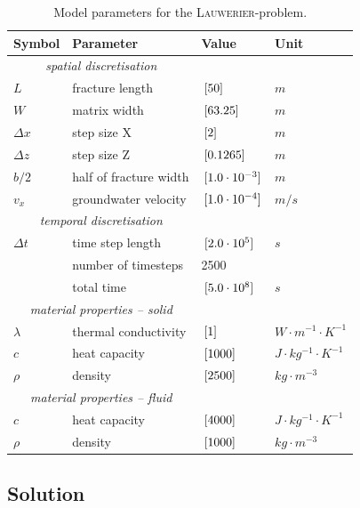 \begin{table}[!htbp]
\caption{\label{tab-lauwerier-parameters}Model parameters for the \textsc{Lauwerier}-problem.}
\begin{center}
\begin{tabular}{llll}
\toprule
Symbol & Parameter & Value & Unit \\
\midrule
\multicolumn{2}{c}{\textit{spatial discretisation}} \\
$L$ & fracture length	& $\, \mathrm{[}50]{}$ & ${m}$  \\
$W$ & matrix width & $\, \mathrm{[}63.25]{}$ & ${m}$  \\
$\Delta x$ & step size X 			& $\, \mathrm{[}2]{}$ & ${m}$  \\
$\Delta z$ & step size Z			& $\, \mathrm{[}0.1265]{}$ & ${m}$  \\
$b/2$ & half of fracture width 	& $\, \mathrm{[}1.0 \cdot 10^{-3}]{}$ & ${m}$  \\
$v_x$ & groundwater velocity 		& $\, \mathrm{[}1.0 \cdot 10^{-4}]{}$ & ${m/s}$ \\
\cmidrule{1-4}
\multicolumn{2}{c}{\textit{temporal discretisation}}\\
$\Delta t$ & time step length 			& $\, \mathrm{[}2.0 \cdot 10^{5}]{}$ & ${s}$  \\ 
& number of timesteps 				& 2500 \\
& total time 						& $\, \mathrm{[}5.0 \cdot 10^{8}]{}$ & ${s}$  \\
\cmidrule{1-4}
\multicolumn{2}{c}{\textit{material properties -- solid}}\\
$\lambda$ & thermal conductivity 	& $\, \mathrm{[}1]{}$ & ${W \cdot m^{-1} \cdot K^{-1}}$  \\
$c$ & heat capacity 				& $\, \mathrm{[}1000]{}$ & ${J \cdot kg^{-1} \cdot K^{-1}}$  \\
$\rho$ & density 					& $\, \mathrm{[}2500]{}$ & ${kg \cdot m^{-3}}$  \\
\cmidrule{1-4}
\multicolumn{2}{c}{\textit{material properties -- fluid}}\\
$c$ & heat capacity 				& $\, \mathrm{[}4000]{}$ & ${J \cdot kg^{-1} \cdot K^{-1}}$  \\
$\rho$ & density 					& $\, \mathrm{[}1000]{}$ & ${kg \cdot m^{-3}}$  \\
\bottomrule
\end{tabular}
\end{center}
\end{table}

\subsection{Solution}

